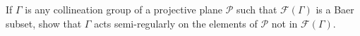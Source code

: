 If $\Gamma$ is any collineation group of a projective plane $\mathcal{P}$ such that $\mathcal{F}(\Gamma)$ is a Baer subset, show that $\Gamma$ acts semi-regularly on the elements of $\mathcal{P}$ not in $\mathcal{F}(\Gamma)$.
